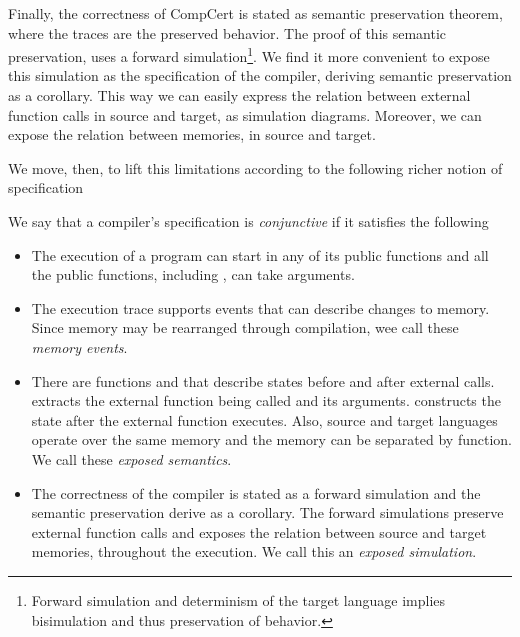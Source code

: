 Finally, the correctness of CompCert is stated as semantic preservation theorem, where the traces are the preserved behavior. The proof of this semantic preservation, uses a forward simulation\footnote{Forward simulation and determinism of the target language implies bisimulation and thus preservation of behavior.}. We find it more convenient to expose this simulation as the specification of the compiler, deriving semantic preservation as a corollary. This way we can easily express the relation between external function calls in source and target, as simulation diagrams. Moreover, we can expose the relation between memories, in source and target. 
 
We move, then, to lift this limitations according to the following richer notion of specification  
\begin{definition} 
We say that a compiler's specification is \emph{conjunctive} if it satisfies the following
\begin{itemize}
\item The execution of a program can start in any of its public functions and all the public functions, including , can take arguments.  
\item The execution trace supports events that can describe changes to memory. Since memory may be rearranged through compilation, wee call these \emph{memory events}.
\item There are functions  and  that describe states before and after external calls.  extracts the external function being called and its arguments.  constructs the state after the external function executes. Also, source and target languages operate over the same memory and the memory can be separated by  function. We call these \emph{exposed semantics}.
\item The correctness of the compiler is stated as a forward simulation and the semantic preservation derive as a corollary. The forward simulations preserve external function calls and exposes the relation between source and target memories, throughout the execution. We call this an \emph{exposed simulation}. 
\end{itemize}
\end{definition}


